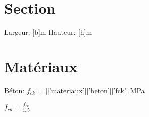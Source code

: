 


\section{Section}

Largeur: [{b}]m
Hauteur: [{h}]m

\section{Matériaux}

Béton: $f_{ck}$ = [{['materiaux']['beton']['fck']}]MPa

$ f_{cd} = \frac{f_{ck}}{1,5} $

